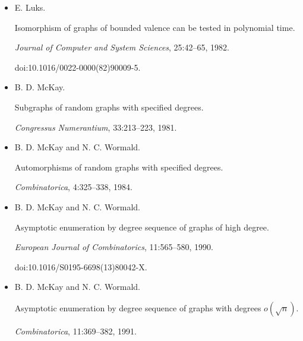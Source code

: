 \documentclass[10pt,a4paper]{article}
\begin{document}
\begin{itemize}
N. Linial and J. Mosheiff.


On the rigidity of sparse random graphs.


\emph{Journal of Graph Theory}, 85(2):466–480, 2017.


doi:10.1002/JGT.22073.





\item[] 
[40]

E. Luks.


Isomorphism of graphs of bounded valence can be tested in polynomial
time.


\emph{Journal of Computer and System Sciences}, 25:42–65, 1982.


doi:10.1016/0022-0000(82)90009-5.





\item[] 
[41]

B. D. McKay.


Subgraphs of random graphs with specified degrees.


\emph{Congressus Numerantium}, 33:213–223, 1981.





\item[] 
[42]

B. D. McKay and N. C. Wormald.


Automorphisms of random graphs with specified degrees.


\emph{Combinatorica}, 4:325–338, 1984.





\item[] 
[43]

B. D. McKay and N. C. Wormald.


Asymptotic enumeration by degree sequence of graphs of high degree.


\emph{European Journal of Combinatorics}, 11:565–580, 1990.


doi:10.1016/S0195-6698(13)80042-X.





\item[] 
[44]

B. D. McKay and N. C. Wormald.


Asymptotic enumeration by degree sequence of graphs with degrees
$o(\sqrt{n})$.


\emph{Combinatorica}, 11:369–382, 1991.






\end{itemize}
\end{document}
